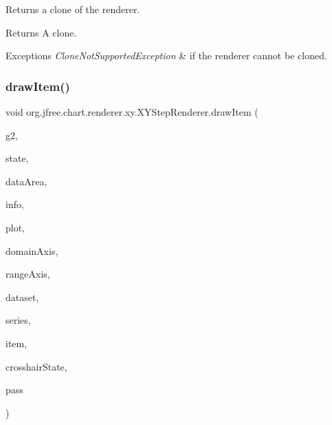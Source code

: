 Returns a clone of the renderer.

\begin{DoxyReturn}{Returns}
A clone.
\end{DoxyReturn}

\begin{DoxyExceptions}{Exceptions}
{\em Clone\+Not\+Supported\+Exception} & if the renderer cannot be cloned. \\
\hline
\end{DoxyExceptions}
\mbox{\label{classorg_1_1jfree_1_1chart_1_1renderer_1_1xy_1_1_x_y_step_renderer_a92f696807629d779f2579cd54e98019d}} 
\subsubsection{\texorpdfstring{draw\+Item()}{drawItem()}}
{\footnotesize\ttfamily void org.\+jfree.\+chart.\+renderer.\+xy.\+X\+Y\+Step\+Renderer.\+draw\+Item (\begin{DoxyParamCaption}\item[{Graphics2D}]{g2,  }\item[{\mbox{\hyperlink{classorg_1_1jfree_1_1chart_1_1renderer_1_1xy_1_1_x_y_item_renderer_state}{X\+Y\+Item\+Renderer\+State}}}]{state,  }\item[{Rectangle2D}]{data\+Area,  }\item[{\mbox{\hyperlink{classorg_1_1jfree_1_1chart_1_1plot_1_1_plot_rendering_info}{Plot\+Rendering\+Info}}}]{info,  }\item[{\mbox{\hyperlink{classorg_1_1jfree_1_1chart_1_1plot_1_1_x_y_plot}{X\+Y\+Plot}}}]{plot,  }\item[{\mbox{\hyperlink{classorg_1_1jfree_1_1chart_1_1axis_1_1_value_axis}{Value\+Axis}}}]{domain\+Axis,  }\item[{\mbox{\hyperlink{classorg_1_1jfree_1_1chart_1_1axis_1_1_value_axis}{Value\+Axis}}}]{range\+Axis,  }\item[{\mbox{\hyperlink{interfaceorg_1_1jfree_1_1data_1_1xy_1_1_x_y_dataset}{X\+Y\+Dataset}}}]{dataset,  }\item[{int}]{series,  }\item[{int}]{item,  }\item[{\mbox{\hyperlink{classorg_1_1jfree_1_1chart_1_1plot_1_1_crosshair_state}{Crosshair\+State}}}]{crosshair\+State,  }\item[{int}]{pass }\end{DoxyParamCaption})}

